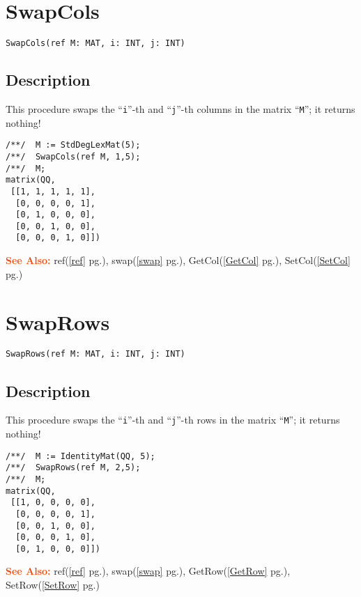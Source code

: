 \documentclass[a4paper]{mybook}
\newenvironment{command}{}{} %
\newcommand\SeeAlso{\par\textcolor{OrangeRed}{\textbf{\large See Also: }}}
\begin{document}
\section{SwapCols}
\label{SwapCols}
\begin{command} %


\begin{Verbatim}[label=syntax, rulecolor=\color{MidnightBlue},
frame=single]
SwapCols(ref M: MAT, i: INT, j: INT)
\end{Verbatim}


\subsection*{Description}

This procedure swaps the ``\verb&i&''-th and ``\verb&j&''-th columns in the
matrix ``\verb&M&''; it returns nothing!
\begin{Verbatim}[label=example, rulecolor=\color{PineGreen}, frame=single]
/**/  M := StdDegLexMat(5);
/**/  SwapCols(ref M, 1,5);
/**/  M;
matrix(QQ,
 [[1, 1, 1, 1, 1],
  [0, 0, 0, 0, 1],
  [0, 1, 0, 0, 0],
  [0, 0, 1, 0, 0],
  [0, 0, 0, 1, 0]])
\end{Verbatim}


\SeeAlso %
  ref(\ref{ref} pg.\pageref{ref}), 
    swap(\ref{swap} pg.\pageref{swap}), 
    GetCol(\ref{GetCol} pg.\pageref{GetCol}), 
    SetCol(\ref{SetCol} pg.\pageref{SetCol})
\end{command} %

\section{SwapRows}
\label{SwapRows}
\begin{command} %


\begin{Verbatim}[label=syntax, rulecolor=\color{MidnightBlue},
frame=single]
SwapRows(ref M: MAT, i: INT, j: INT)
\end{Verbatim}


\subsection*{Description}

This procedure swaps the ``\verb&i&''-th and ``\verb&j&''-th rows in the
matrix ``\verb&M&''; it returns nothing!
\begin{Verbatim}[label=example, rulecolor=\color{PineGreen}, frame=single]
/**/  M := IdentityMat(QQ, 5);
/**/  SwapRows(ref M, 2,5);
/**/  M;
matrix(QQ,
 [[1, 0, 0, 0, 0],
  [0, 0, 0, 0, 1],
  [0, 0, 1, 0, 0],
  [0, 0, 0, 1, 0],
  [0, 1, 0, 0, 0]])
\end{Verbatim}


\SeeAlso %
  ref(\ref{ref} pg.\pageref{ref}), 
    swap(\ref{swap} pg.\pageref{swap}), 
    GetRow(\ref{GetRow} pg.\pageref{GetRow}), 
    SetRow(\ref{SetRow} pg.\pageref{SetRow})
\end{command} %
\end{document}

